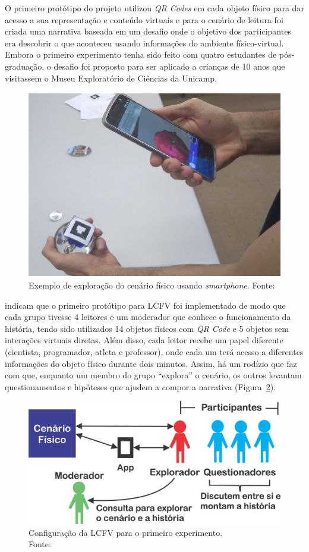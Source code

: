 O primeiro protótipo do projeto utilizou \textit{QR Codes} em cada objeto físico para dar acesso a sua representação e conteúdo virtuais e para o cenário de leitura foi criada uma narrativa baseada em um desafio onde o objetivo dos participantes era descobrir o que aconteceu usando informações do ambiente físico-virtual. Embora o primeiro experimento tenha sido feito com quatro estudantes de pós-graduação, o desafio foi proposto para ser aplicado a crianças de 10 anos que visitassem o Museu Exploratório de Ciências da Unicamp.

\begin{figure}[htb]
	\centering
	\includegraphics[width=0.6\linewidth]{chapters/works/imamura2018.png}
	\captionsetup{justification=centering}
	\caption{Exemplo de exploração do cenário físico usando \textit{smartphone}. Fonte:~\cite{imamura:2018}}
	\label{fig:imamura2018}
\end{figure}

\cite{imamura:2018} indicam que o primeiro protótipo para LCFV foi implementado de modo que cada grupo tivesse 4 leitores e um moderador que conhece o funcionamento da história, tendo sido utilizados 14 objetos físicos com \textit{QR Code} e 5 objetos sem interações virtuais diretas. Além disso, cada leitor recebe um papel diferente (cientista, programador, atleta e professor), onde cada um terá acesso a diferentes informações do objeto físico durante dois minutos. Assim, há um rodízio que faz com que, enquanto um membro do grupo ``explora'' o cenário, os outros levantam questionamentos e hipóteses que ajudem a compor a narrativa (Figura~\ref{fig:imamura2018_LCFV}).

\begin{figure}[htb]
	\centering
	\includegraphics[width=0.7\linewidth]{chapters/works/imamura2018_LCFV.png}
	\captionsetup{justification=centering}	
	\caption{Configuração da LCFV para o primeiro experimento. \\Fonte:~\cite{imamura:2018}}
	\label{fig:imamura2018_LCFV}
\end{figure}

